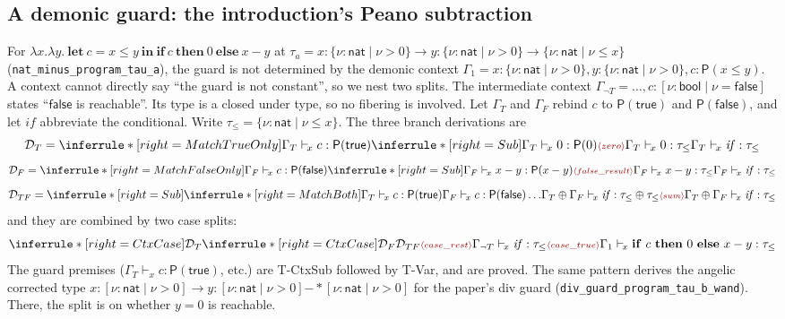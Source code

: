 \documentclass[10pt]{article}
\newcommand{\ov}[2]{\{\nu{:}#1 \mid #2\}}          %
\newcommand{\un}[2]{[\nu{:}#1 \mid #2]}            %
\newcommand{\Prec}[1]{\mathsf{P}(#1)}               %
\newcommand{\Nat}{\mathsf{nat}}
\newcommand{\Bool}{\mathsf{bool}}
\newcommand{\wand}{\mathrel{-\!\!*}}
\newcommand{\Sum}{\oplus}
\newcommand{\entc}{\mathrel{,}}
\newcommand{\vd}{\vdash_{\!x}}
\newcommand{\kw}[1]{\ensuremath{\mathbf{#1}}}
\newcommand{\rocq}[1]{\texttt{#1}}
\newcommand{\obl}[1]{\ensuremath{\textcolor{red!60!black}{\scriptstyle\langle #1\rangle}}}
\begin{document}
\subsection{A demonic guard: the introduction's Peano subtraction}\label{sec:minus}

For $\lambda x.\lambda y.\ \kw{let}\ c = x\le y\ \kw{in}\ \kw{if}\ c\ \kw{then}\ 0\ \kw{else}\ x-y$
at $\tau_a = x{:}\ov{\Nat}{\nu>0}\to y{:}\ov{\Nat}{\nu>0}\to\ov{\Nat}{\nu\le x}$
(\rocq{nat\_minus\_program\_tau\_a}), the guard is not determined by the
demonic context
$\Gamma_1 = x{:}\ov{\Nat}{\nu{>}0}\entc y{:}\ov{\Nat}{\nu{>}0}\entc c{:}\Prec{x\le y}$.
A context cannot directly say ``the guard is not constant'', so we nest two
splits. The intermediate context
$\Gamma_{\neg T} = \ldots\entc c{:}\un{\Bool}{\nu=\mathsf{false}}$ states
``$\mathsf{false}$ is reachable''. Its type is a closed under type, so no
fibering is involved. Let $\Gamma_T$ and $\Gamma_F$ rebind $c$ to
$\Prec{\mathsf{true}}$ and $\Prec{\mathsf{false}}$, and let
$\mathit{if}$ abbreviate the conditional.
Write $\tau_{\le} = \ov{\Nat}{\nu\le x}$. The three branch derivations are
\[
\mathcal{D}_T =
\inferrule*[right=MatchTrueOnly]
 {\Gamma_T\vd c:\Prec{\mathsf{true}} \\
  \inferrule*[right=Sub]{\Gamma_T\vd 0:\Prec{0} \\ \obl{zero}}{\Gamma_T\vd 0:\tau_{\le}}}
 {\Gamma_T\vd \mathit{if}:\tau_{\le}}
\]
\[
\mathcal{D}_F =
\inferrule*[right=MatchFalseOnly]
 {\Gamma_F\vd c:\Prec{\mathsf{false}} \\
  \inferrule*[right=Sub]{\Gamma_F\vd x-y:\Prec{x-y} \\ \obl{false\_result}}{\Gamma_F\vd x-y:\tau_{\le}}}
 {\Gamma_F\vd \mathit{if}:\tau_{\le}}
\]
\[
\mathcal{D}_{TF} =
\inferrule*[right=Sub]
 {\inferrule*[right=MatchBoth]
   {\Gamma_T\vd c:\Prec{\mathsf{true}} \\ \Gamma_F\vd c:\Prec{\mathsf{false}} \\ \ldots}
   {\Gamma_T\Sum\Gamma_F\vd \mathit{if}:\tau_{\le}\Sum\tau_{\le}}
  \\ \obl{sum}}
 {\Gamma_T\Sum\Gamma_F\vd \mathit{if}:\tau_{\le}}
\]
and they are combined by two case splits:
\[
\inferrule*[right=CtxCase]
 {\mathcal{D}_T \\
  \inferrule*[right=CtxCase]
   {\mathcal{D}_F \\ \mathcal{D}_{TF} \\ \obl{case\_rest}}
   {\Gamma_{\neg T}\vd \mathit{if}:\tau_{\le}}
  \\ \obl{case\_true}}
 {\Gamma_1\vd \kw{if}\ c\ \kw{then}\ 0\ \kw{else}\ x-y : \tau_{\le}}
\]
The guard premises ($\Gamma_T\vd c:\Prec{\mathsf{true}}$, etc.) are T-CtxSub
followed by T-Var, and are proved. The same pattern derives the angelic
corrected type $x{:}\un{\Nat}{\nu>0}\to y{:}\un{\Nat}{\nu>0}\wand\un{\Nat}{\nu>0}$
for the paper's \textsf{div} guard (\rocq{div\_guard\_program\_tau\_b\_wand}). There, the split is on
whether $y=0$ is reachable.
\end{document}
